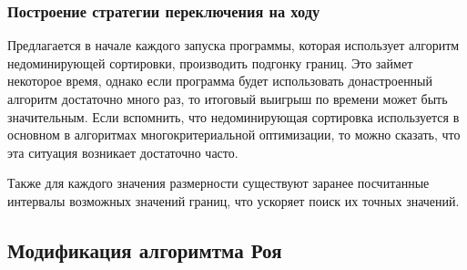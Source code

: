 \subsubsection{Построение стратегии переключения на ходу}

Предлагается в начале каждого запуска программы, которая использует алгоритм недоминирующей сортировки, производить
подгонку границ. Это займет некоторое время, однако если программа будет использовать донастроенный алгоритм
достаточно много раз, то итоговый выигрыш по времени может быть значительным. Если вспомнить, что недоминирующая
сортировка используется в основном в алгоритмах многокритериальной оптимизации, то можно сказать, что эта ситуация
возникает достаточно часто.

Также для каждого значения размерности существуют заранее посчитанные интервалы возможных значений границ, что
ускоряет поиск их точных значений.

\subsection{Модификация алгоримтма Роя}


